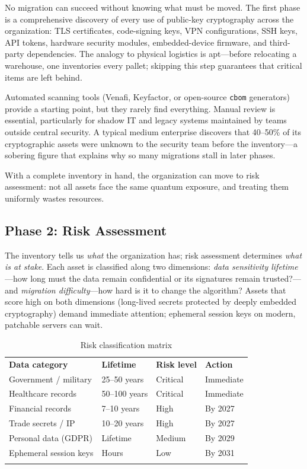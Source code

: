 No migration can succeed without knowing what must be moved.  The first phase is a comprehensive discovery of every use of public-key cryptography across the organization: TLS certificates, code-signing keys, VPN configurations, SSH keys, API tokens, hardware security modules, embedded-device firmware, and third-party dependencies.  The analogy to physical logistics is apt---before relocating a warehouse, one inventories every pallet; skipping this step guarantees that critical items are left behind.

Automated scanning tools (Venafi, Keyfactor, or open-source \texttt{cbom} generators) provide a starting point, but they rarely find everything.  Manual review is essential, particularly for shadow IT and legacy systems maintained by teams outside central security.  A typical medium enterprise discovers that 40--50\% of its cryptographic assets were unknown to the security team before the inventory---a sobering figure that explains why so many migrations stall in later phases.

With a complete inventory in hand, the organization can move to risk assessment: not all assets face the same quantum exposure, and treating them uniformly wastes resources.

\subsection{Phase 2: Risk Assessment}
\label{subsec:phase-risk}

The inventory tells us \emph{what} the organization has; risk assessment determines \emph{what is at stake}.  Each asset is classified along two dimensions: \emph{data sensitivity lifetime}---how long must the data remain confidential or its signatures remain trusted?---and \emph{migration difficulty}---how hard is it to change the algorithm?  Assets that score high on both dimensions (long-lived secrets protected by deeply embedded cryptography) demand immediate attention; ephemeral session keys on modern, patchable servers can wait.

\begin{table}[t]
\caption{Risk classification matrix}
\label{tab:risk-matrix}
\begin{tabular}{p{3.5cm}p{2.5cm}p{2.5cm}p{3cm}}
\hline\noalign{\smallskip}
\textbf{Data category} & \textbf{Lifetime} & \textbf{Risk level} & \textbf{Action} \\
\noalign{\smallskip}\svhline\noalign{\smallskip}
Government / military & 25--50 years & Critical & Immediate \\
Healthcare records & 50--100 years & Critical & Immediate \\
Financial records & 7--10 years & High & By 2027 \\
Trade secrets / IP & 10--20 years & High & By 2027 \\
Personal data (GDPR) & Lifetime & Medium & By 2029 \\
Ephemeral session keys & Hours & Low & By 2031 \\
\noalign{\smallskip}\hline
\end{tabular}
\end{table}

